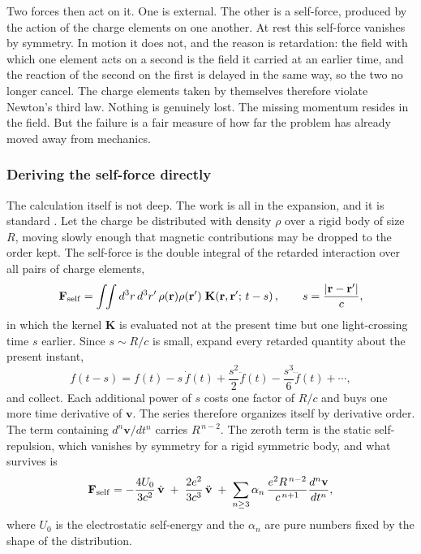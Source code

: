 \documentclass[preprint]{aastex701}
\begin{document}
Two forces then act on it. One is external. The other is a self-force, produced
by the action of the charge elements on one another. At rest this self-force
vanishes by symmetry. In motion it does not, and the reason is retardation: the
field with which one element acts on a second is the field it carried at an
earlier time, and the reaction of the second on the first is delayed in the same
way, so the two no longer cancel. The charge elements taken by themselves
therefore violate Newton's third law. Nothing is genuinely lost. The missing
momentum resides in the field. But the failure is a fair measure of how far the
problem has already moved away from mechanics.

\subsubsection{Deriving the self-force directly}
\label{sec:direct}

The calculation itself is not deep. The work is all in the expansion, and it is
standard \citep[see, e.g.,][]{jackson1999,rohrlich2007}. Let the
charge be distributed with density $\rho$ over a rigid body of size $R$, moving
slowly enough that magnetic contributions may be dropped to the order kept. The
self-force is the double integral of the retarded interaction over all pairs of
charge elements,
\begin{equation}
\mathbf F_{\rm self} = \int\!\!\int d^3r\,d^3r'\,\rho(\mathbf r)\rho(\mathbf r')
\;\mathbf K\!\left(\mathbf r,\mathbf r';\,t - s\right),
\qquad s = \frac{|\mathbf r - \mathbf r'|}{c},
\label{eq:selfforce}
\end{equation}
in which the kernel $\mathbf K$ is evaluated not at the present time but one
light-crossing time $s$ earlier. Since $s \sim R/c$ is small, expand every
retarded quantity about the present instant,
\begin{equation}
f(t-s) = f(t) - s\,\dot f(t) + \frac{s^2}{2}\ddot f(t)
- \frac{s^3}{6}\dddot f(t) + \cdots,
\label{eq:retexp}
\end{equation}
and collect. Each additional power of $s$ costs one factor of $R/c$ and buys one
more time derivative of $\mathbf v$. The series therefore organizes itself by
derivative order. The term containing $d^n\mathbf v/dt^n$ carries $R^{\,n-2}$.
The zeroth term is the static self-repulsion, which vanishes by symmetry for a
rigid symmetric body, and what survives is
\begin{equation}
\mathbf F_{\rm self}
= -\frac{4U_0}{3c^2}\,\dot{\mathbf v}
\;+\; \frac{2e^2}{3c^3}\,\ddot{\mathbf v}
\;+\; \sum_{n\ge3}\alpha_n\,\frac{e^2R^{\,n-2}}{c^{\,n+1}}
\frac{d^n\mathbf v}{dt^n},
\label{eq:ALseries}
\end{equation}
where $U_0$ is the electrostatic self-energy and the $\alpha_n$ are pure numbers
fixed by the shape of the distribution.
\end{document}
